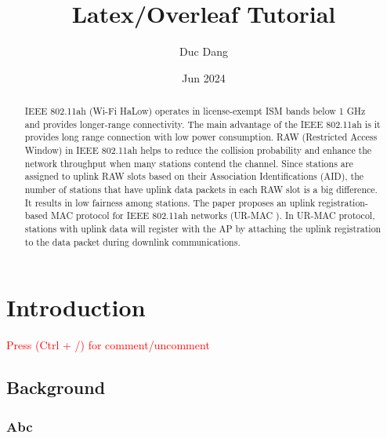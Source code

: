 \documentclass[twocolumn ]{article}
\title{Latex/Overleaf Tutorial}
\author{Duc Dang}
\date{Jun 2024}
\begin{document}
\maketitle


\begin{abstract}
IEEE 802.11ah (Wi-Fi HaLow) operates in license-exempt ISM bands below 1 GHz and provides longer-range connectivity. The main advantage of the IEEE 802.11ah is it provides long range connection with low power consumption. RAW (Restricted Access Window) in IEEE 802.11ah helps to reduce the collision probability and enhance the network throughput when many stations contend the channel. Since stations are assigned to uplink RAW slots based on their Association Identifications (AID), the number of stations that have uplink data packets in each RAW slot is a big difference. It results in low fairness among stations. The paper proposes an uplink registration-based MAC protocol for IEEE 802.11ah networks (UR-MAC ). In UR-MAC  protocol, stations with uplink data will register with the AP by attaching the uplink registration to the data packet during downlink communications. 
\end{abstract}

\section{Introduction}
\label{intro}

\textcolor{red}{Press (Ctrl + /) for comment/uncomment}

\subsection{Background}

\subsubsection{Abc}






\end{document}
